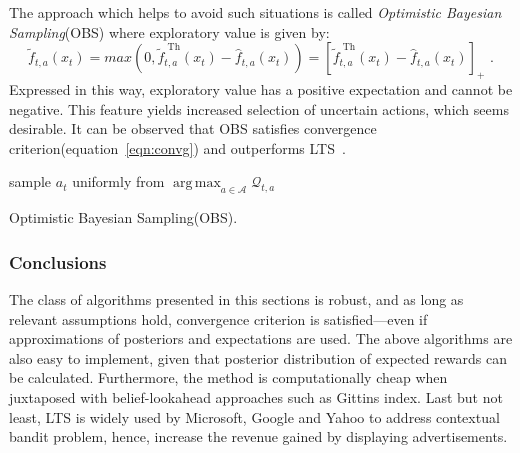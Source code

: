 \documentclass[12pt, a4paper, pdflatex, leqno, twoside]{report}
\begin{document}
The approach which helps to avoid such situations is called \emph{Optimistic Bayesian 
Sampling}(OBS) where exploratory value is given by:
$$
  \tilde{f}_{t,a} (x_t) = max \left( 0, \tilde{f}_{t,a}^{\text{ Th}} (x_t) - 
\hat{f}_{t,a}(x_t) \right)
                        = \left [ \tilde{f}_{t,a}^{\text{ Th}} (x_t) - 
\hat{f}_{t,a}(x_t) \right]_+
                        \text{ .}
$$
Expressed in this way, exploratory value has a positive expectation and cannot be 
negative. This feature yields increased selection of uncertain actions, which 
seems desirable. It can be observed that OBS satisfies convergence 
criterion(equation~\ref{eqn:convg}) and outperforms 
LTS~\citep{May:2012:OBS:2503308.2343711}.\\

\vspace{2cm}
\begin{algorithm}[H]
  sample $a_t$ uniformly from $\operatorname{arg\,max}_{a \in \mathscr{A}} 
\mathscr{Q}_{t,a}$ \;
 \caption{Optimistic Bayesian Sampling(OBS).\label{al:OBS}}
\end{algorithm}
\vspace{2cm}

\subsubsection{Conclusions}
The class of algorithms presented in this sections is robust, and as long as relevant assumptions 
hold, convergence criterion is satisfied---even if approximations of posteriors 
and expectations are used. The above algorithms are also easy to implement, given 
that posterior distribution of expected rewards can be calculated. Furthermore, 
the method is computationally cheap when juxtaposed with belief-lookahead 
approaches such as Gittins index. Last but not least, LTS is widely used by 
Microsoft, Google and Yahoo to address contextual bandit problem, hence, increase the revenue gained by displaying advertisements.\\
\end{document}
